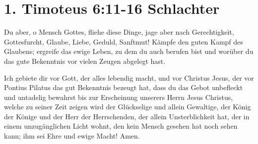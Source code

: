 
\section{1. Timoteus 6:11-16 \small{Schlachter}}
Du aber, o Mensch Gottes, fliehe diese Dinge, jage aber nach Gerechtigkeit,
Gottesfurcht, Glaube, Liebe, Geduld, Sanftmut! Kämpfe den guten Kampf des Glaubens; ergreife das ewige Leben, zu dem du auch berufen bist und worüber du das gute Bekenntnis vor vielen Zeugen abgelegt hast.

Ich gebiete dir vor Gott, der alles lebendig macht, und vor Christus Jesus, der vor Pontius Pilatus das gut Bekenntnis bezeugt hat, dass du das Gebot unbefleckt und untadelig bewahrst bis zur Erscheinung unserers Herrn Jesus Christus, welche zu seiner Zeit zeigen wird der Glückselige und allein Gewaltige, der König der Könige und der Herr der Herrschenden, der allein Unsterblichkeit hat, der in einem unzugänglichen Licht wohnt, den kein Mensch gesehen hat noch sehen kann; ihm sei Ehre und ewige Macht! Amen.

